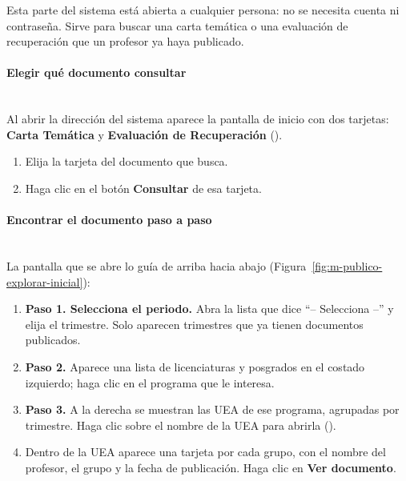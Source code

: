 Esta parte del sistema está abierta a cualquier persona: no se necesita cuenta ni contraseña. Sirve para buscar una carta temática o una evaluación de recuperación que un profesor ya haya publicado.

\paragraph{Elegir qué documento consultar}\mbox{}\\
Al abrir la dirección del sistema aparece la pantalla de inicio con dos tarjetas: \textbf{Carta Temática} y \textbf{Evaluación de Recuperación} ().

\begin{enumerate}
    \item Elija la tarjeta del documento que busca.
    \item Haga clic en el botón \textbf{Consultar} de esa tarjeta.
\end{enumerate}

\paragraph{Encontrar el documento paso a paso}\mbox{}\\
La pantalla que se abre lo guía de arriba hacia abajo (Figura~\ref{fig:m-publico-explorar-inicial}):

\begin{enumerate}
    \item \textbf{Paso 1. Selecciona el periodo.} Abra la lista que dice ``-- Selecciona --'' y elija el trimestre. Solo aparecen trimestres que ya tienen documentos publicados.
    \item \textbf{Paso 2.} Aparece una lista de licenciaturas y posgrados en el costado izquierdo; haga clic en el programa que le interesa.
    \item \textbf{Paso 3.} A la derecha se muestran las UEA de ese programa, agrupadas por trimestre. Haga clic sobre el nombre de la UEA para abrirla ().
    \item Dentro de la UEA aparece una tarjeta por cada grupo, con el nombre del profesor, el grupo y la fecha de publicación. Haga clic en \textbf{Ver documento}.
\end{enumerate}



